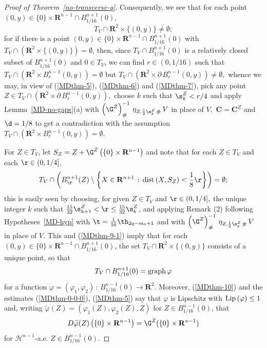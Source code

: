 \documentclass[a4paper,11pt]{amsart}
\begin{document}
\begin{proof}[Proof of Theorem~\ref{no-transverse-q}]
Consequently, we see that  for each point $(0, y) \in \{0\} \times {\mathbf R}^{n-1} \cap B_{1/16}^{n+1}(0),$
\begin{equation}\label{MDthm-9-1}
T_{V} \cap {\mathbf R}^{2} \times \{(0, y)\} \neq \emptyset;
\end{equation}
for if there is a point $(0, y) \in \{0\} \times {\mathbf R}^{n-1} \cap B_{1/16}^{n+1}(0)$ with $T_{V} \cap \left({\mathbf R}^{2} \times \{(0, y)\}\right) = \emptyset$, then, since $T_{V} \cap B_{1/16}^{n+1}(0)$ is a relatively closed 
subset of $B_{1/16}^{n+1}(0)$ and $0 \in T_{V}$, we can find $r \in (0, 1/16)$ such that $T_{V} \cap \left({\mathbf R}^{2} \times B_{r}^{n-1}(0,y)\right) = \emptyset$ but 
$T_{V} \cap \left({\mathbf R}^{2} \times \partial \, B_{r}^{n-1}(0,y)\right) \neq \emptyset,$ whence we may, in view of (\ref{MDthm-5}), (\ref{MDthm-6})  and (\ref{MDthm-7}), pick any point $Z \in T_{V} \cap \left({\mathbf R}^{2} \times \partial \, B_{r}^{n-1}(0,y)\right),$ choose $k$ such that $\s_{k}^{Z} < r/4$ and apply
Lemma~\ref{MD-no-gaps}(a) with $\left(\G^{Z}\right)^{-1}_{\#} \, \eta_{Z, \frac{1}{2}\s_{k}^{Z} \, \#} \, V$ in place of $V,$ ${\mathbf C} = {\mathbf C}^{Z}$ and $\d = 1/8$ to get a contradiction with the assumption $T_{V} \cap \left({\mathbf R}^{2} \times B_{r}^{n-1}(0,y)\right) = \emptyset$. 
   
For $Z \in T_{V}$, let $S_{Z} = Z + \G^{Z}\left(\{0\} \times {\mathbf R}^{n-1}\right)$ and note that for each $Z \in T_{V}$ and each $\r \in (0, 1/4]$, 
\begin{equation}\label{MDthm-10}
T_{V} \cap \left(B_{\r}^{n+1}(Z) \setminus \left\{X \in {\mathbf R}^{n+1} \, : \, {\rm dist} \, (X, S_{Z}) <  \frac{1}{8}\r\right\}\right) = \emptyset;
\end{equation}
this is easily seen by choosing, for given $Z \in T_{V}$ and $\r \in (0, 1/4],$ the unique integer $k$ such that $\frac{15}{32}\s_{k+1}^{Z} < \r \leq \frac{15}{32}\s_{k}^{Z}$, and applying Remark (2) following Hypotheses~\ref{MD-hyp} with $\t = \frac{1}{16}\th_{2q-m_{0}+1}$ and with $\left(\G^{Z}\right)^{-1}_{\#} \, \eta_{Z, \frac{1}{2}\s_{k}^{Z} \, \#} \, V$ in place of $V.$ This and (\ref{MDthm-9-1}) imply that for each $(0, y) \in \{0\} \times {\mathbf R}^{n-1} \cap B_{1/16}^{n+1}(0)$, the set $T_{V} \cap {\mathbf R}^{2} \times \{(0, y)\}$ consists of a unique point, so that 
\begin{equation}\label{MDthm-graph}
T_{V} \cap B_{1/16}^{n+1}(0) = {\rm graph} \, \varphi
\end{equation}
for a function $\varphi  = (\varphi_{1}, \varphi_{2})\, : \, B_{1/16}^{n-1}(0) \to {\mathbf R}^{2}.$ Moreover, (\ref{MDthm-10}) and the estimates  (\ref{MDthm-0-0-0}), (\ref{MDthm-5}) say that $\varphi$ is Lipschitz with ${\rm Lip} \, (\varphi) \leq 1$ and, writing $\widetilde{\varphi}(Z) = (\varphi_{1}(Z), \varphi_{2}(Z), Z)$ for $Z \in B_{1/16}^{n-1}(0)$,  that 
\begin{equation}\label{MDthm-slope}
D\widetilde{\varphi}(Z)\left(\{0\}\times {\mathbf R}^{n-1}\right)  = \G^{Z}(\{0\} \times {\mathbf R}^{n-1})
\end{equation}
for ${\mathcal H}^{n-1}$-a.e. $Z \in B_{1/16}^{n-1}(0).$



\end{proof}
\end{document}
